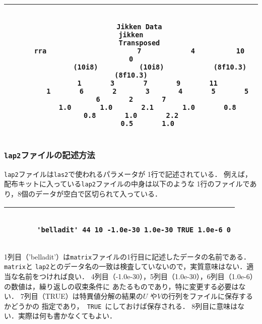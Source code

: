 \bigskip

\small
\begin{tabular}{|c|} \hline
\begin{minipage}{134mm}
\begin{verbatim}

    Jikken Data                                                             jikken
    Transposed
    rra                      7            4          10             0
              (10i8)          (10i8)            (8f10.3)            (8f10.3)
        1       3       7       9       11
        1       6       2       3       4       5       5       6       2       7
        1.0       1.0       2.1       1.0       0.8       0.8       1.0       2.2
        0.5       1.0

\end{verbatim}
\end{minipage}
\\
\hline
\end{tabular}
\normalsize

\bigskip

\subsubsection{{\tt lap2}ファイルの記述方法}

{\tt lap2}ファイルは{\tt las2}で使われるパラメータが 1行で記述されている．
例えば，配布キットに入っている{\tt lap2}ファイルの中身は以下のような
1行のファイルであり，8個のデータが空白で区切られて入っている．

\bigskip

\small
\begin{tabular}{|c|} \hline
\begin{minipage}{134mm}
\begin{verbatim}

       'belladit' 44 10 -1.0e-30 1.0e-30 TRUE 1.0e-6 0

\end{verbatim}
\end{minipage}
\\
\hline
\end{tabular}
\normalsize

\bigskip

1列目（'belladit'）は{\tt matrix}ファイルの1行目に記述したデータの名前である．{\tt matrix}と
{\tt lap2}とのデータ名の一致は検査していないので，実質意味はない．適当な名前をつければ良い．
4列目（-1.0e-30），5列目（1.0e-30），6列目（1.0e-6）の数値は，繰り返しの収束条件に
あたるものであり，特に変更する必要はない．
7列目（TRUE）は特異値分解の結果の\( U \) や\( V \)の行列をファイルに保存するかどうかの
指定であり，\verb| TRUE |にしておけば保存される．
8列目に意味はない．実際は何も書かなくてもよい．

